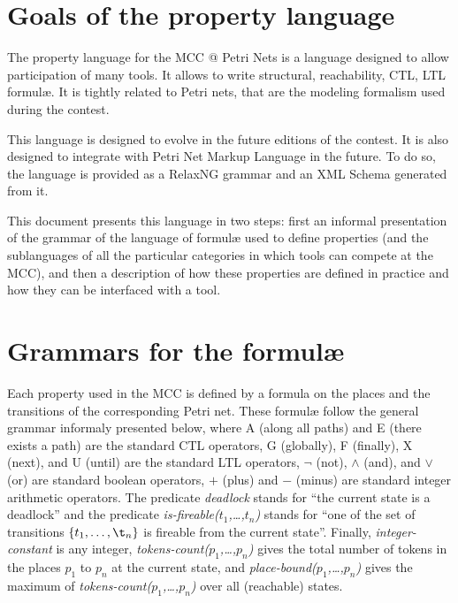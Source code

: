 \documentclass[10pt,english,a4paper]{article}
\newcommand{\mcc}[0]{MCC}
\begin{document}
\color{defaultcolor}

\section*{Goals of the property language}
The property language for the \mcc{} @ Petri Nets is a language designed to allow
participation of many tools.
It allows to write structural, reachability, CTL, LTL formul{\ae}.
It is tightly related to Petri nets, that are the modeling formalism used during the contest.

This language is designed to evolve in the future editions of the contest.
It is also designed to integrate with Petri Net Markup Language in the future.
To do so, the language is provided as a RelaxNG grammar and an XML Schema generated from it.

This document presents this language in two steps: first an informal presentation of the grammar of the language of formulæ used to define properties (and the sublanguages of all the particular categories in which tools can compete at the MCC), and then a description of how these properties are defined in practice and how they can be interfaced with a tool.

\tableofcontents
\clearpage

\section{Grammars for the formulæ}

Each property used in the MCC is defined by a formula on the places and the transitions of the corresponding Petri net. These formulæ follow the general grammar informaly presented below, where A (along all paths) and E (there exists a path) are the standard CTL operators, G (globally), F (finally), X (next), and U (until) are the standard LTL operators, $\lnot$ (not), $\wedge$ (and), and $\vee$ (or) are standard boolean operators, $+$ (plus) and $-$ (minus) are standard integer arithmetic operators.
The predicate \emph{deadlock} stands for ``the current state is a deadlock'' and the predicate \emph{is-fireable($t_1$,\dots,$t_n$)} stands for ``one of the set of transitions $\{t_1,\dots,\t_n\}$ is fireable from the current state''.
Finally, \emph{integer-constant} is any integer, \emph{tokens-count($p_1$,\dots,$p_n$)} gives the total number of tokens in the places $p_1$ to $p_n$ at the current state, and \emph{place-bound($p_1$,\dots,$p_n$)} gives the maximum of \emph{tokens-count($p_1$,\dots,$p_n$)} over all (reachable) states.
\end{document}
